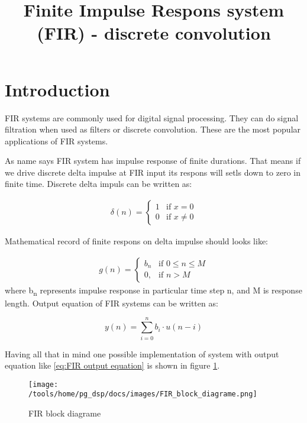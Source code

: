 \documentclass[a4paper, 12pt]{article}
\begin{document}
\title{Finite Impulse Respons system (FIR) - discrete convolution}
\date{}
\maketitle

\section{Introduction}

FIR systems are commonly used for digital signal processing. They can do signal filtration when used as filters or discrete convolution. These are the most popular applications of FIR systems. 

As name says FIR system has impulse response of finite durations. That means if we drive discrete delta impulse at FIR input its respons will setls down to zero in finite time. Discrete delta impuls can be written as:

\begin{align}
	\delta(n) = 
	\left\{
		\begin{array}{ll}
			1 & \mbox{if } x = 0 \\
			0 & \mbox{if } x \neq 0
		\end{array}
	\right.		
\end{align}

Mathematical record of finite respons on delta impulse should looks like:

\begin{align}
	g(n) =
	\left\{
		\begin{array}{ll}
			b_n & \mbox{if } 0 \leq n \leq M \\
			0, & \mbox{if } n > M		
		\end{array}
	\right.
\end{align} where b\textsubscript{n} represents impulse response in particular time step n, and M is response length. Output equation of FIR systems can be written as:

\begin{equation}\label{eq:FIR output equation}
y(n) = \sum_{i=0}^{n}{b_{i} \cdot u(n-i)}
\end{equation}

Having all that in mind one possible implementation of system with output equation like \eqref{eq:FIR output equation} is shown in figure \ref{fig:FIR block diagrame}.

\begin{figure}[h]
\texttt{[image: /tools/home/pg\_dsp/docs/images/FIR\_block\_diagrame.png]}
\caption{FIR block diagrame}
\label{fig:FIR block diagrame}
\end{figure}
\end{document}
